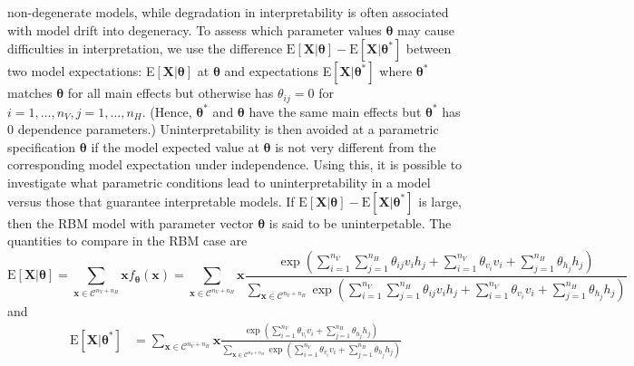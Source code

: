 \documentclass[AMS,STIX1COL]{WileyNJD-v2}
\newcommand{\nv}{{n_{\scriptscriptstyle V}}}
\newcommand{\nh}{{n_{\scriptscriptstyle H}}}
\begin{document}
non-degenerate models, while degradation in interpretability is often
associated with model drift into degeneracy. To assess which parameter
values \(\boldsymbol \theta\) may cause difficulties in interpretation,
we use the difference
\(\text{E}\left[\boldsymbol X | \boldsymbol \theta\right] - \text{E}\left[\boldsymbol X | \boldsymbol \theta^* \right]\)
between two model expectations:
E\(\left[\boldsymbol X | \boldsymbol \theta\right]\) at
\(\boldsymbol \theta\) and expectations
E\(\left[\boldsymbol X | \boldsymbol \theta^* \right]\) where
\(\boldsymbol \theta^*\) matches \(\boldsymbol \theta\) for all main
effects but otherwise has \(\theta_{ij} = 0\) for
\(i = 1, \dots, \nv, j = 1, \dots, \nh\). (Hence,
\(\boldsymbol \theta^*\) and \(\boldsymbol \theta\) have the same main
effects but \(\boldsymbol \theta^*\) has \(0\) dependence parameters.)
Uninterpretability is then avoided at a parametric specification
\(\boldsymbol \theta\) if the model expected value at
\(\boldsymbol \theta\) is not very different from the corresponding
model expectation under independence. Using this, it is possible to
investigate what parametric conditions lead to uninterpretability in a
model versus those that guarantee interpretable models. If
\(\text{E}\left[\boldsymbol X | \boldsymbol \theta\right] - \text{E}\left[\boldsymbol X | \boldsymbol \theta^*\right]\)
is large, then the RBM model with parameter vector
\(\boldsymbol \theta\) is said to be uninterpetable. The quantities to
compare in the RBM case are \[
\text{E}\left[\boldsymbol X | \boldsymbol \theta\right] = \sum\limits_{\boldsymbol x \in \mathcal{C}^{\nv + \nh}} \boldsymbol x f_{\boldsymbol \theta}(\boldsymbol x) = \sum\limits_{\boldsymbol x \in \mathcal{C}^{\nv + \nh}} \boldsymbol x \frac{\exp\left(\sum\limits_{i = 1}^\nv \sum\limits_{j=1}^\nh \theta_{ij} v_i h_j + \sum\limits_{i = 1}^\nv\theta_{v_i} v_i + \sum\limits_{j = 1}^\nh\theta_{h_j} h_j\right)}{\sum\limits_{\boldsymbol x \in \mathcal{C}^{\nv + \nh}}\exp\left(\sum\limits_{i = 1}^\nv \sum\limits_{j=1}^\nh \theta_{ij} v_i h_j + \sum\limits_{i = 1}^\nv\theta_{v_i} v_i + \sum\limits_{j = 1}^\nh\theta_{h_j} h_j\right)}
\] and \begin{align*}
\text{E}\left[\boldsymbol X | \boldsymbol 
\theta^*\right] &= \sum\limits_{\boldsymbol x \in \mathcal{C}^{\nv + \nh}} \boldsymbol x \frac{\exp\left(\sum\limits_{i = 1}^\nv \theta_{v_i} v_i + \sum\limits_{j = 1}^\nh\theta_{h_j} h_j\right)}{\sum\limits_{\boldsymbol x \in \mathcal{C}^{\nv + \nh}}\exp\left(\sum\limits_{i = 1}^\nv\theta_{v_i} v_i + \sum\limits_{j = 1}^\nh\theta_{h_j} h_j\right)} \\
\end{align*}
\end{document}
